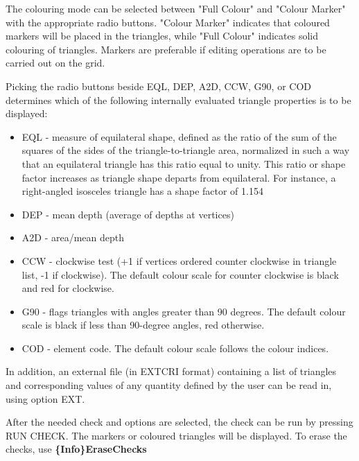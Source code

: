 \documentclass{article}
\begin{document}
The colouring mode can be selected between "Full Colour" and "Colour Marker" with the appropriate radio buttons.  "Colour Marker" indicates that coloured markers will be placed in the triangles, while "Full Colour" indicates solid colouring of triangles. Markers are preferable if editing operations are to be carried out on the grid.

Picking the radio buttons beside EQL, DEP, A2D, CCW, G90, or COD determines which of the following internally evaluated triangle properties is to be displayed:

\begin{itemize}
\item EQL - measure of equilateral shape, defined as the ratio of the sum of the squares of the sides of the triangle-to-triangle area, normalized in such a way that an equilateral triangle has this ratio equal to unity. This ratio or shape factor increases as triangle shape departs from equilateral. For instance, a right-angled isosceles triangle has a shape factor of 1.154
\item DEP - mean depth (average of depths at vertices)
\item A2D - area/mean depth
\item CCW - clockwise test (+1 if vertices ordered counter clockwise in triangle list, -1 if clockwise). The default colour scale for counter clockwise is black and red for clockwise.
\item G90 - flags triangles with angles greater than 90 degrees. The default colour scale is black if less than 90-degree angles, red otherwise.
\item COD - element code. The default colour scale follows the colour indices.
\end{itemize}
In addition, an external file (in EXTCRI format) containing a list of triangles and corresponding values of any quantity defined by the user can be read in, using option EXT.

After the needed check and options are selected, the check can be run by pressing RUN CHECK. The markers or coloured triangles will be displayed. To erase the checks, use \textbf{\{Info\}EraseChecks}
\end{document}

